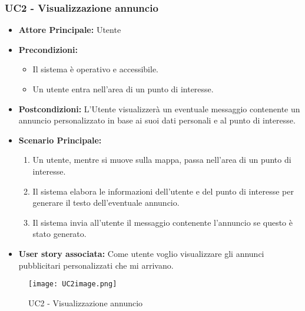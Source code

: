 \documentclass[11pt]{article}
\begin{document}
\begin{justify}
\subsubsection{\textbf{UC2 - Visualizzazione annuncio}}
\begin{itemize}
    \item \textbf{Attore Principale:} Utente
    \item \textbf{Precondizioni:} 
        \begin{itemize}
    	\item Il sistema è operativo e accessibile.
    	\item Un utente entra nell'area di un punto di interesse.
        \end{itemize}
    \item \textbf{Postcondizioni:} L'Utente visualizzerà un eventuale messaggio contenente un annuncio personalizzato in base ai suoi dati personali e al punto di interesse.
    \item \textbf{Scenario Principale:} 
        \begin{enumerate}
            \item Un utente, mentre si muove sulla mappa, passa    nell'area di un punto di interesse.
            \item Il sistema elabora le informazioni dell'utente e del punto di interesse per generare il testo dell'eventuale annuncio.
            \item Il sistema invia all'utente il messaggio contenente l'annuncio se questo è stato generato.
        \end{enumerate}
    \item \textbf{User story associata:} Come utente voglio visualizzare gli annunci pubblicitari personalizzati che mi arrivano.
\end{itemize}
\begin{figure}[ht]
    \centering
    \texttt{[image: UC2image.png]}
    \caption{UC2 - Visualizzazione annuncio}
    \label{fig:UC2}
\end{figure}


\end{justify}
\end{document}
